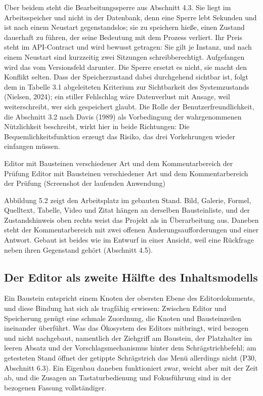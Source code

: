 Über beidem steht die Bearbeitungssperre aus Abschnitt 4.3. Sie liegt im Arbeitsspeicher und nicht in der Datenbank, denn eine Sperre lebt Sekunden und ist nach einem Neustart gegenstandslos; sie zu speichern hieße, einen Zustand dauerhaft zu führen, der seine Bedeutung mit dem Prozess verliert. Ihr Preis steht im API-Contract und wird bewusst getragen: Sie gilt je Instanz, und nach einem Neustart sind kurzzeitig zwei Sitzungen schreibberechtigt. Aufgefangen wird das vom Versionsfeld darunter. Die Sperre ersetzt es nicht, sie macht den Konflikt selten. Dass der Speicherzustand dabei durchgehend sichtbar ist, folgt dem in Tabelle 3.1 abgeleiteten Kriterium zur Sichtbarkeit des Systemzustands (Nielsen, 2024); ein stiller Fehlschlag wäre Datenverlust mit Ansage, weil weiterschreibt, wer sich gespeichert glaubt. Die Rolle der Benutzerfreundlichkeit, die Abschnitt 3.2 nach Davis (1989) als Vorbedingung der wahrgenommenen Nützlichkeit beschreibt, wirkt hier in beide Richtungen: Die Bequemlichkeitsfunktion erzeugt das Risiko, das drei Vorkehrungen wieder einfangen müssen.

%
{Editor mit Bausteinen verschiedener Art und dem Kommentarbereich der Prüfung}%
{Editor mit Bausteinen verschiedener Art und dem Kommentarbereich der Prüfung (Screenshot der laufenden Anwendung)}

Abbildung 5.2 zeigt den Arbeitsplatz im gebauten Stand. Bild, Galerie, Formel, Quelltext, Tabelle, Video und Zitat hängen an derselben Bausteinliste, und der Zustandshinweis oben rechts weist das Projekt als in Überarbeitung aus. Daneben steht der Kommentarbereich mit zwei offenen Änderungsaufforderungen und einer Antwort. Gebaut ist beides wie im Entwurf in einer Ansicht, weil eine Rückfrage neben ihren Gegenstand gehört (Abschnitt 4.5).

\subsection{Der Editor als zweite Hälfte des Inhaltsmodells}

Ein Baustein entspricht einem Knoten der obersten Ebene des Editordokuments, und diese Bindung hat sich als tragfähig erwiesen: Zwischen Editor und Speicherung genügt eine schmale Zuordnung, die Knoten und Bausteinzeilen ineinander überführt. Was das Ökosystem des Editors mitbringt, wird bezogen und nicht nachgebaut, namentlich der Ziehgriff am Baustein, der Platzhalter im leeren Absatz und der Vorschlagsmechanismus hinter dem Schrägstrichbefehl; am getesteten Stand öffnet der getippte Schrägstrich das Menü allerdings nicht (P30, Abschnitt 6.3). Ein Eigenbau daneben funktioniert zwar, weicht aber mit der Zeit ab, und die Zusagen an Tastaturbedienung und Fokusführung sind in der bezogenen Fassung vollständiger.


